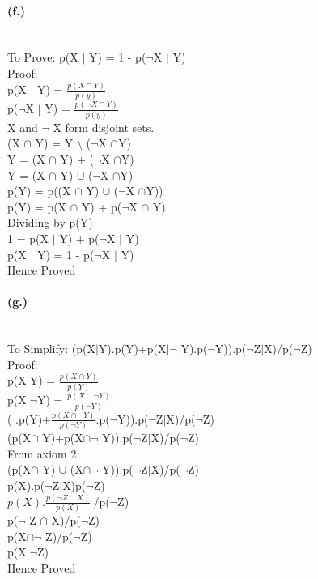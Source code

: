 \documentclass{article}
\begin{document}
{\paragraph{(f.)}
\\To Prove: p(X $\mid$ Y) = 1 - p($\neg$X $\mid$ Y)
\\Proof:
\\p(X $\mid$ Y) = $\frac{p(X\cap Y)}{p(y)}$
\\p($\neg$X $\mid$ Y) = $\frac{p(\neg X\cap Y)}{p(y)}$
\\X and $\neg$ X form disjoint sets.
\\(X $\cap$ Y) = Y $\setminus$ ($\neg$X $\cap$Y)
\\\Rightarrow Y = (X $\cap$ Y) + ($\neg$X $\cap$Y)
\\\Rightarrow Y = (X $\cap$ Y) $\cup$ ($\neg$X $\cap$Y)
\\ p(Y) = p((X $\cap$ Y) $\cup$ ($\neg$X $\cap$Y))
\\p(Y) = p(X $\cap$ Y) + p($\neg$X $\cap$ Y)
\\Dividing by p(Y)
\\1 = p(X $\mid$ Y) + p($\neg$X $\mid$ Y)
\\\Rightarrow p(X $\mid$ Y) = 1 -  p($\neg$X $\mid$ Y)
\\Hence Proved
\paragraph{(g.)}
\\To Simplify: (p(X$\mid$Y).p(Y)+p(X$\mid \neg$ Y).p($\neg$Y)).p($\neg$Z$\mid$X)/p($\neg$Z)
\\Proof:
\\p(X$\mid$Y) = $\frac{p(X\cap Y)}{p(Y)}$
\\p(X$\mid \neg$Y) = $\frac{p(X\cap \neg Y)}{p(\neg Y)}$
\\\Rightarrow ( .p(Y)+$\frac{p(X\cap \neg Y)}{p(\neg Y)}$.p($\neg$Y)).p($\neg$Z$\mid$X)/p($\neg$Z)
\\\Rightarrow (p(X$\cap$ Y)+p(X$\cap \neg$ Y)).p($\neg$Z$\mid$X)/p($\neg$Z)
\\From axiom 2:
\\\Rightarrow (p(X$\cap$ Y) $\cup$ (X$\cap \neg$ Y)).p($\neg$Z$\mid$X)/p($\neg$Z)
\\\Rightarrow p(X).{p($\neg$Z$\mid$X)}{p($\neg$Z)}
\\\Rightarrow $p(X).\frac{p(\neg Z \cap X)}{p(X)}\ $/p($\neg$Z)
\\\Rightarrow p($\neg$ Z $\cap$ X)/p($\neg$Z)
\\\Rightarrow p(X$\cap \neg$ Z)/p($\neg$Z)
\\\Rightarrow p(X$\mid \neg$Z)
\\Hence Proved
}
\end{document}

